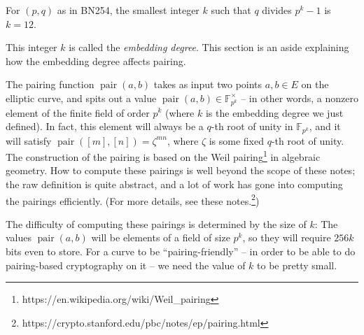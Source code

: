 \begin{proposition}
For \((p,q)\) as in BN254, the smallest integer \(k\) such that \(q\)
divides \(p^{k} - 1\) is \(k = 12\).
\end{proposition}

This integer \(k\) is called the \emph{embedding degree}. This section
is an aside explaining how the embedding degree affects pairing.

The pairing function \(\operatorname{pair}(a,b)\) takes as input two
points \(a,b \in E\) on the elliptic curve, and spits out a value
\(\operatorname{pair}(a,b) \in {\mathbb{F}}_{p^{k}}^{\times}\) -- in
other words, a nonzero element of the finite field of order \(p^{k}\)
(where \(k\) is the embedding degree we just defined). In fact, this
element will always be a \(q\)-th root of unity in
\({\mathbb{F}}_{p^{k}}\), and it will satisfy
\(\operatorname{pair}([ m],[ n]) = \zeta^{mn}\),
where \(\zeta\) is some fixed \(q\)-th root of unity. The construction
of the pairing is based on the Weil pairing\footnote{https://en.wikipedia.org/wiki/Weil\_pairing}
in algebraic geometry. How to compute these pairings is well beyond the
scope of these notes; the raw definition is quite abstract, and a lot of
work has gone into computing the pairings efficiently. (For more
details, see these notes.\footnote{https://crypto.stanford.edu/pbc/notes/ep/pairing.html})

The difficulty of computing these pairings is determined by the size of
\(k\): The values \(\operatorname{pair}(a,b)\) will be elements of a
field of size \(p^{k}\), so they will require \(256k\) bits even to
store. For a curve to be ``pairing-friendly'' -- in order to be able to
do pairing-based cryptography on it -- we need the value of \(k\) to be
pretty small.
